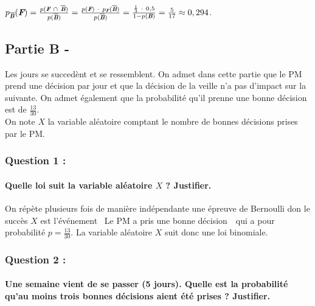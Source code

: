 \documentclass[a4paper, 12pt]{article}
\begin{document}
$p_{\overline{\emph{\textbf{B}}}}(\emph{\textbf{F}}) = \frac{p(\emph{\textbf{F}}\ \cap \ \overline{\emph{\textbf{B}}})}{p(\overline{\emph{\textbf{B}}})}
= \frac{p(\emph{\textbf{F}})\ \cdot \ p_{\emph{\textbf{F}}}(\overline{\emph{\textbf{B}}})}{p(\overline{\emph{\textbf{B}}})}
= \frac{\frac{1}{3}\ \cdot \ 0,5}{1-p(\emph{\textbf{B}})} = \frac{5}{17} \approx 0,294$.
\vspace{2cm}

{}
\subsection*{Partie B -}
Les jours se succedènt et se ressemblent. On admet dans cette partie que le PM prend une décision par jour et que la décision de la veille n'a pas d'impact sur la suivante. 
On admet également que la probabilité qu'il prenne une bonne décision est de $\frac{13}{30}$.
\\
On note $X$ la variable aléatoire comptant le nombre de bonnes décisions prises par le PM.

{}
\subsubsection*{Question 1 :}
\paragraph*{Quelle loi suit la variable aléatoire $X$ ? Justifier. \\[5mm]}

On répète plusieurs fois de manière indépendante une épreuve de Bernoulli don le succès $X$ est l'événement \guillemotleft \ Le PM a pris une bonne décision\ \guillemotright \
qui a pour probabilité $p = \frac{13}{30}$. La variable aléatoire $X$ suit donc une loi binomiale.

{}
\subsubsection*{Question 2 :}
\paragraph*{Une semaine vient de se passer (5 jours). Quelle est la probabilité qu'au moins trois bonnes décisions aient été prises ? Justifier.\\[5mm]}
\end{document}
